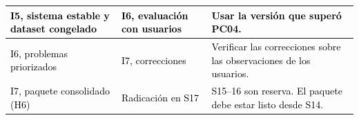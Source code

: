 \begin{longtable}{|p{}|p{}|p{}|}
\textcolor{black}{I5, sistema estable y \textcolor{black}{dataset congelado}} & \textcolor{black}{I6, evaluación con usuarios} & \textcolor{black}{Usar la versión que superó PC04.}\\\hline
\textcolor{black}{I6, problemas priorizados} & \textcolor{black}{I7, correcciones} & \textcolor{black}{Verificar las correcciones sobre las observaciones de los usuarios.}\\\hline
\textcolor{black}{I7, paquete consolidado (H6)} & \textcolor{black}{Radicación en S17} & \textcolor{black}{S15–16 son reserva. El paquete debe estar listo desde S14.}\\\hline
\end{longtable}  
\endgroup
